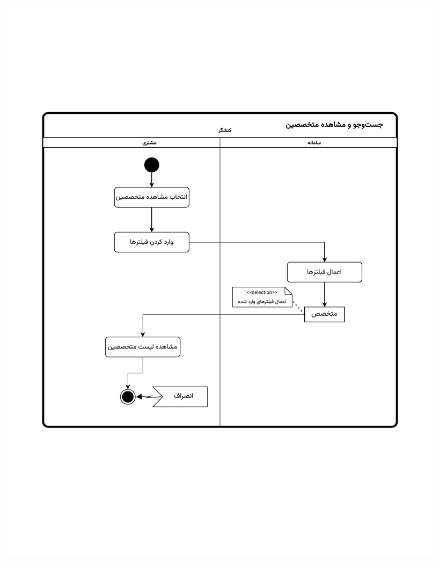 \begin{figure}[ht!]
	\centering
	\includegraphics[scale=0.8, page=1]{figs/OOD-activity-searchspec.pdf}
\end{figure}
\FloatBarrier
\newpage

